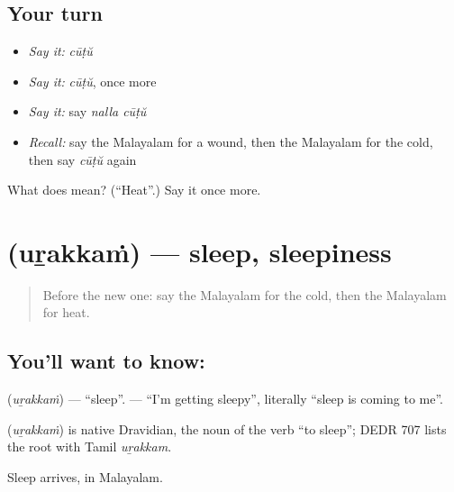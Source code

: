 \subsection*{Your turn}
\begin{itemize}
\raggedright
  \item \emph{Say it:} \emph{cūṭŭ}
  \item \emph{Say it:} \emph{cūṭŭ}, once more
  \item \emph{Say it:} say \emph{nalla cūṭŭ}
  \item \emph{Recall:} say the Malayalam for a wound, then the Malayalam for the cold, then say \emph{cūṭŭ} again
\end{itemize}

\begin{tcolorbox}[breakable,colback=teal!4,colframe=teal!35!black,title={Before you move on}]
What does  mean? (\textquotedblleft{}Heat\textquotedblright{}.) Say it once more.
\end{tcolorbox}
\section[\texorpdfstring{\ml{ഉറക്കം} (uṟakkaṁ)}{ഉറക്കം (uṟakkaṁ)}]{ (uṟakkaṁ) — sleep, sleepiness}

\label{lesson:ML-C118-sleep}



\begin{quote}
Before the new one: say the Malayalam for the cold, then the Malayalam for heat.
\end{quote}

\subsection*{You'll want to know: }
\textbf{} (\emph{uṟakkaṁ}) — \textquotedblleft{}sleep\textquotedblright{}. \textbf{  } — \textquotedblleft{}I'm getting sleepy\textquotedblright{}, literally \textquotedblleft{}sleep is coming to me\textquotedblright{}.

\begin{cousinweb}
\textbf{} (\emph{uṟakkaṁ}) is native Dravidian, the noun of the verb \textquotedblleft{}to sleep\textquotedblright{}; DEDR 707 lists the root with Tamil \emph{uṟakkam}.
\end{cousinweb}

\begin{grammarlens}[title={What you've built}]
Sleep arrives, in Malayalam.
\end{grammarlens}

